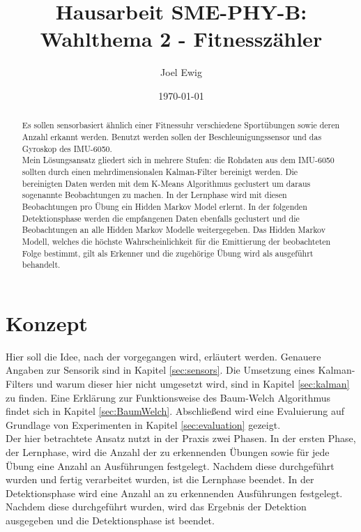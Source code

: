 \documentclass{article}
\begin{document}
\title{Hausarbeit SME-PHY-B: Wahlthema 2 - Fitnesszähler}
\author{Joel Ewig}
\date{\today}
\maketitle
\clearpage

\begin{abstract}
Es sollen sensorbasiert ähnlich einer Fitnessuhr verschiedene Sportübungen sowie deren Anzahl erkannt werden.
Benutzt werden sollen der Beschleunigungssensor und das Gyroskop des IMU-6050.\\
Mein Lösungsansatz gliedert sich in mehrere Stufen:
die Rohdaten aus dem IMU-6050 sollten durch einen mehrdimensionalen Kalman-Filter bereinigt werden.
Die bereinigten Daten werden mit dem K-Means Algorithmus geclustert um daraus sogenannte \glqq{}Beobachtungen\grqq{} zu machen. %
In der Lernphase wird mit diesen Beobachtungen pro Übung ein Hidden Markov Model erlernt.
In der folgenden Detektionsphase werden die empfangenen Daten ebenfalls geclustert und die Beobachtungen an alle Hidden Markov Modelle weitergegeben.
Das Hidden Markov Modell, welches die höchste Wahrscheinlichkeit für die Emittierung der beobachteten Folge bestimmt, gilt als Erkenner und die zugehörige Übung wird als ausgeführt behandelt.
\end{abstract}
\clearpage

\tableofcontents
\clearpage

\section{Konzept}
\label{sec:concept}
Hier soll die Idee, nach der vorgegangen wird, erläutert werden.
Genauere Angaben zur Sensorik sind in Kapitel \ref{sec:sensors}.
Die Umsetzung eines Kalman-Filters und warum dieser hier nicht umgesetzt wird, sind in Kapitel \ref{sec:kalman} zu finden.
Eine Erklärung zur Funktionsweise des Baum-Welch Algorithmus findet sich in Kapitel \ref{sec:BaumWelch}.
Abschließend wird eine Evaluierung auf Grundlage von Experimenten in Kapitel \ref{sec:evaluation} gezeigt.\\
Der hier betrachtete Ansatz nutzt in der Praxis zwei Phasen.
In der ersten Phase, der Lernphase, wird die Anzahl der zu erkennenden Übungen sowie für jede Übung eine Anzahl an Ausführungen festgelegt.
Nachdem diese durchgeführt wurden und fertig verarbeitet wurden, ist die Lernphase beendet.
In der Detektionsphase wird eine Anzahl an zu erkennenden Ausführungen festgelegt.
Nachdem diese durchgeführt wurden, wird das Ergebnis der Detektion ausgegeben und die Detektionsphase ist beendet.
\end{document}
